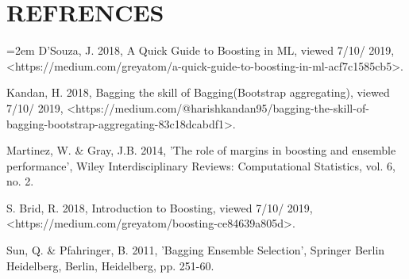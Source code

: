 \documentclass{article}
\begin{document}
\section{REFRENCES}\label{refrences}
\begin{flushleft}

\hangindent=2em
D'Souza, J. 2018, A Quick Guide to Boosting in ML, viewed 7/10/ 2019, <https://medium.com/greyatom/a-quick-guide-to-boosting-in-ml-acf7c1585cb5>.\linebreak

Kandan, H. 2018, Bagging the skill of Bagging(Bootstrap aggregating), viewed 7/10/ 2019, <https://medium.com/@harishkandan95/bagging-the-skill-of-bagging-bootstrap-aggregating-83c18dcabdf1>.\linebreak

Martinez, W. & Gray, J.B. 2014, 'The role of margins in boosting and ensemble performance', Wiley Interdisciplinary Reviews: Computational Statistics, vol. 6, no. 2.

S. Brid, R. 2018, Introduction to Boosting, viewed 7/10/ 2019, <https://medium.com/greyatom/boosting-ce84639a805d>.\linebreak

Sun, Q. & Pfahringer, B. 2011, 'Bagging Ensemble Selection', Springer Berlin Heidelberg, Berlin, Heidelberg, pp. 251-60.\linebreak



\pagebreak
\end{flushleft}
\end{document}
